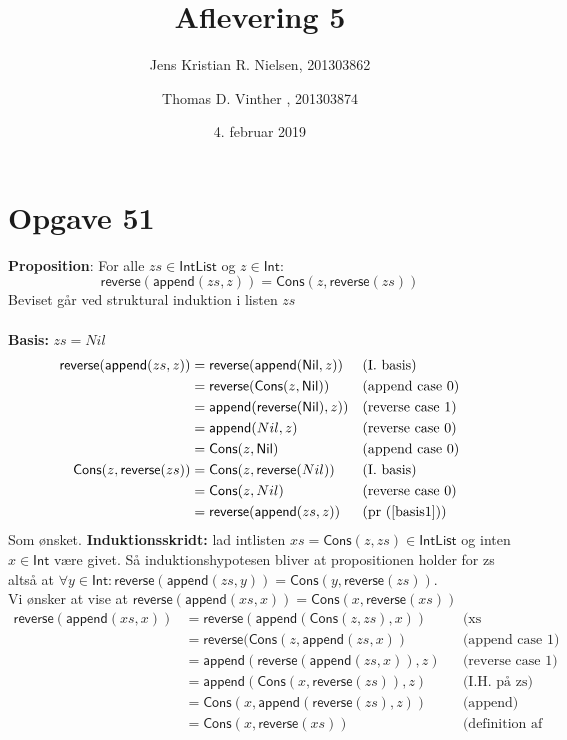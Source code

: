 \documentclass[a4paper, 10pt]{article}
\title{Aflevering 5}
\author{Jens Kristian R. Nielsen, 201303862 \and Thomas D. Vinther , 201303874}
\date{4. februar 2019}
\newcommand\reverse{\textsf{reverse}}
\newcommand\append{\textsf{append}}
\newcommand\Cons{\textsf{Cons}}
\newcommand\Nil{\textsf{Nil}}
\newcommand\IntList{\textsf{IntList}}
\newcommand\Int{\textsf{Int}}
\begin{document}
\maketitle

\section*{Opgave 51}
\textbf{Proposition}: For alle $zs \in \IntList$ og $z \in \Int$:
\[
  \reverse(\append(zs, z)) = \Cons(z, \reverse(zs))
\]
Beviset går ved struktural induktion i listen $zs$ \\
\\
\textbf{Basis:} $zs = Nil$
\begin{align}
  \reverse(\append(zs, z)) &= \reverse(\append(\Nil,z)) && \text{(I. basis)} \nonumber\\
                           &= \reverse(\Cons(z,\Nil)) && \text{(append case 0)} \nonumber\\
                           &= \append(\reverse(\Nil),z)) && \text{(reverse case 1)} \nonumber\\
                           &= \append(Nil,z) && \text{(reverse case 0)} \nonumber\\
                           &= \Cons(z,\Nil) && \text{(append case 0)} \label{basis1}\\
  \Cons(z,\reverse(zs)) &=\Cons(z,\reverse(Nil)) && \text{(I. basis)} \nonumber\\
                            &= \Cons(z,Nil) && \text{(reverse case 0)}\nonumber\\
                            &= \reverse(\append(zs, z)) && \text{(pr (\ref{basis1}))} \nonumber
\end{align}
Som ønsket.
\textbf{Induktionsskridt:} lad intlisten $xs = \Cons(z,zs)\in\IntList$ og inten $x\in\Int$ være givet. Så induktionshypotesen bliver at propositionen holder for zs altså at $\forall y\in\Int:\reverse(\append(zs, y)) = \Cons(y, \reverse(zs))$.
\\Vi ønsker at vise at $\reverse(\append(xs, x)) = \Cons(x, \reverse(xs))$
\begin{align*}
  \reverse(\append(xs, x)) &= \reverse(\append(\Cons(z,zs),x))  && \text{(xs "dekomposition")}\\
                           &= \reverse(\Cons(z,\append(zs,x))  && \text{(append case 1)}\\
                           &= \append(\reverse(\append(zs,x)),z)  && \text{(reverse case 1)} \\
                           &= \append(\Cons(x,\reverse(zs)),z) && \text{(I.H. på zs)}\\
                           &= \Cons(x,\append(\reverse(zs),z))  && \text{(append)} \\
                           &= \Cons(x,\reverse(xs))  && \text{(definition af reverse på xs)}
\end{align*}
\end{document}
